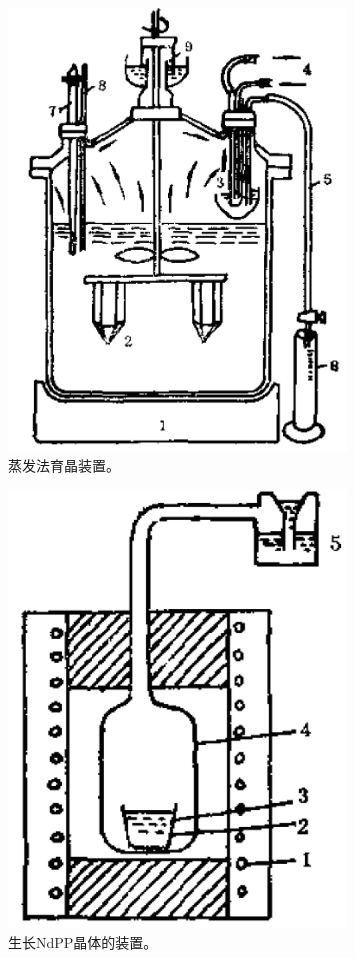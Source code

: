 \begin{figure}[h]
 \centering
 \includegraphics[width=0.8\textwidth]{fig/cp03/img3.23.jpg}
 \caption{蒸发法育晶装置。}
\end{figure}

\begin{figure}[h]
 \centering
 \includegraphics[width=0.8\textwidth]{fig/cp03/img3.24.jpg}
 \caption{生长NdPP晶体的装置。}
\end{figure}

